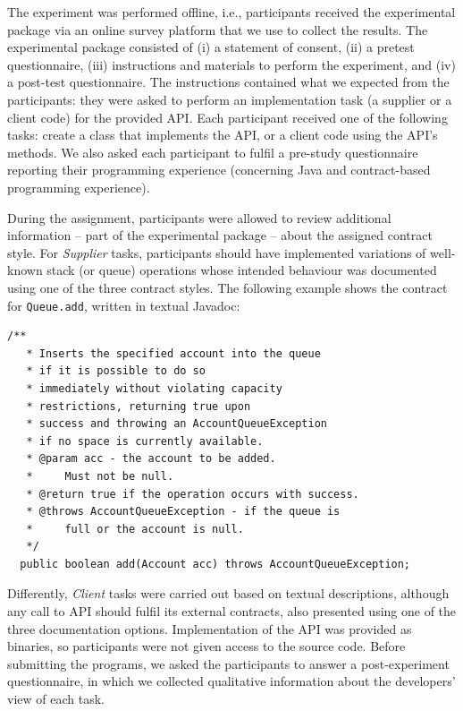 The experiment was performed offline, i.e., participants received the experimental package via an online survey platform that we use to collect the results.
The experimental package consisted of (i) a statement of consent, (ii) a pretest
questionnaire, (iii) instructions and materials to perform the experiment, and (iv) a post-test questionnaire. 
The instructions contained what we expected from the participants: they were asked to perform an implementation task (a supplier or a client code) for the
provided API. Each participant received one of the following tasks: create a class that implements the API, or a client code using the API's methods.
We also asked each participant to fulfil a pre-study questionnaire reporting their programming experience (concerning Java and contract-based programming experience). 

During the assignment, participants were allowed to review additional information -- part of the experimental package -- about the assigned contract style. 
For \textit{Supplier} tasks, participants should have implemented variations of well-known stack (or queue) operations whose intended behaviour was documented using one of the three contract styles. The following example shows the contract for \lstinline!Queue.add!, written in textual Javadoc:

\begin{lstlisting}[basicstyle=\footnotesize\ttfamily,name=figxpi, frame=lines, mathescape=true]
/**
   * Inserts the specified account into the queue 
   * if it is possible to do so 
   * immediately without violating capacity 
   * restrictions, returning true upon 
   * success and throwing an AccountQueueException 
   * if no space is currently available.
   * @param acc - the account to be added. 
   *     Must not be null.
   * @return true if the operation occurs with success.
   * @throws AccountQueueException - if the queue is 
   *     full or the account is null.
   */
  public boolean add(Account acc) throws AccountQueueException;
\end{lstlisting}

Differently, \textit{Client} tasks were carried out based on textual descriptions, although any call to API should fulfil its external contracts, also presented using one of the three documentation options. Implementation of the API was provided as binaries, so participants were not given access to the source code.
Before submitting the programs, we asked the participants to answer a post-experiment questionnaire, in which we collected qualitative information about the developers' view of each task.

